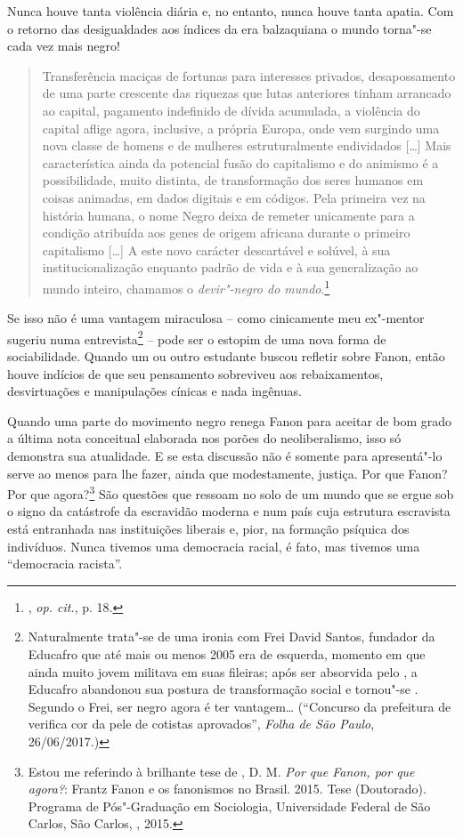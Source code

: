 Nunca houve tanta violência diária e, no entanto, nunca houve tanta
apatia. Com o retorno das desigualdades aos índices da era balzaquiana o
mundo torna"-se cada vez mais negro!

\begin{quote}
Transferência maciças de fortunas
para interesses privados, desapossamento de uma parte crescente das
riquezas que lutas anteriores tinham arrancado ao capital, pagamento
indefinido de dívida acumulada, a violência do capital aflige agora,
inclusive, a própria Europa, onde vem surgindo uma nova classe de homens
e de mulheres estruturalmente endividados {[}\ldots{}{]} Mais característica
ainda da potencial fusão do capitalismo e do animismo é a possibilidade,
muito distinta, de transformação dos seres humanos em coisas animadas,
em dados digitais e em códigos. Pela primeira vez na história humana, o
nome Negro deixa de remeter unicamente para a condição atribuída aos
genes de origem africana durante o primeiro capitalismo {[}\ldots{}{]} A este
novo carácter descartável e solúvel, à sua institucionalização enquanto
padrão de vida e à sua generalização ao mundo inteiro, chamamos o
\emph{devir"-negro do mundo}.\footnote{, \emph{op. cit.}, p. 18.}
\end{quote}

Se isso não é uma vantagem miraculosa -- como cinicamente meu ex"-mentor
sugeriu numa entrevista\footnote{Naturalmente trata"-se de uma ironia com
  Frei David Santos, fundador da Educafro que até mais ou menos 2005 era
  de esquerda, momento em que ainda muito jovem militava em suas
  fileiras; após ser absorvida pelo , a Educafro abandonou sua postura
  de transformação social e tornou"-se . Segundo o Frei, ser negro
  agora é ter vantagem\ldots{} (``Concurso da prefeitura de  verifica cor da
      pele de cotistas aprovados'', \emph{Folha de São Paulo}, 26/06/2017.)}
-- pode ser o estopim de uma nova forma de sociabilidade. Quando um ou
outro estudante buscou refletir sobre Fanon, então houve indícios de que
seu pensamento sobreviveu aos rebaixamentos, desvirtuações e
manipulações cínicas e nada ingênuas.

Quando uma parte do movimento negro renega Fanon para aceitar de bom
grado a última nota conceitual elaborada nos porões do neoliberalismo,
isso só demonstra sua atualidade. E se esta discussão não é somente para
apresentá"-lo serve ao menos para lhe fazer, ainda que modestamente,
justiça. Por que Fanon? Por que agora?\footnote{Estou me referindo à
  brilhante tese de , D. M. \emph{Por que Fanon, por que
  agora?}: Frantz Fanon e os fanonismos no Brasil. 2015. Tese
  (Doutorado). Programa de Pós"-Graduação em Sociologia, Universidade
  Federal de São Carlos, São Carlos, , 2015.} São questões que ressoam
no solo de um mundo que se ergue sob o signo da catástrofe da escravidão
moderna e num país cuja estrutura escravista está entranhada nas
instituições liberais e, pior, na formação psíquica dos indivíduos.
Nunca tivemos uma democracia racial, é fato, mas tivemos uma
``democracia racista''.

